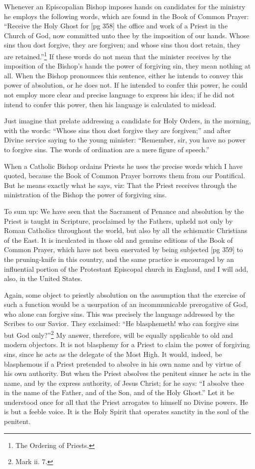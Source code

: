 Whenever an Episcopalian Bishop imposes
hands on candidates for the ministry he employs
the following words, which are found in the Book
of Common Prayer: “Receive the Holy Ghost for
[pg 358]
the office and work of a Priest in the Church of
God, now committed unto thee by the imposition of
our hands. Whose sins thou dost forgive, they
are forgiven; and whose sins thou dost retain, they
are retained.”\footnote{The Ordering
of Priests.} If these words do not mean that
the minister receives by the imposition of the
Bishop's hands the power of forgiving sin, they
mean nothing at all. When the Bishop pronounces
this sentence, either he intends to convey this
power of absolution, or he does not. If he intended
to confer this power, he could not employ
more clear and precise language to express his
idea; if he did not intend to confer this power,
then his language is calculated to mislead.

Just imagine that prelate addressing a candidate
for Holy Orders, in the morning, with the
words: “Whose sins thou dost forgive they are
forgiven;” and after Divine service saying to the
young minister: “Remember, sir, you have no
power to forgive sins. The words of ordination
are a mere figure of speech.”

When a Catholic Bishop ordains Priests he uses
the precise words which I have quoted, because
the Book of Common Prayer borrows them from
our Pontifical. But he means exactly what he
says, viz: That the Priest receives through the
ministration of the Bishop the power of forgiving
sins.

To sum up: We have seen that the Sacrament
of Penance and absolution by the Priest is taught
in Scripture, proclaimed by the Fathers, upheld
not only by Roman Catholics throughout the
world, but also by all the schismatic Christians of
the East. It is inculcated in those old and
genuine editions of the Book of Common Prayer,
which have not been enervated by being subjected
[pg 359]
to the pruning-knife in this country, and the same
practice is encouraged by an influential portion of
the Protestant Episcopal church in England, and
I will add, also, in the United States.

Again, some object to priestly absolution on the
assumption that the exercise of such a function
would be a usurpation of an incommunicable prerogative
of God, who alone can forgive sins. This
was precisely the language addressed by the
Scribes to our Savior. They exclaimed: “He
blasphemeth! who can forgive sins but God
only?”\footnote{Mark ii.
7.} My answer, therefore, will be equally
applicable to old and modern objectors. It is not
blasphemy for a Priest to claim the power of forgiving
sins, since he acts as the delegate of the
Most High. It would, indeed, be blasphemous if a
Priest pretended to absolve in his own name and
by virtue of his own authority. But when the
Priest absolves the penitent sinner he acts in the
name, and by the express authority, of Jesus
Christ; for he says: “I absolve thee in the name
of the Father, and of the Son, and of the Holy
Ghost.” Let it be understood once for all that
the Priest arrogates to himself no Divine powers.
He is but a feeble voice. It is the Holy Spirit that
operates sanctity in the soul of the penitent.

